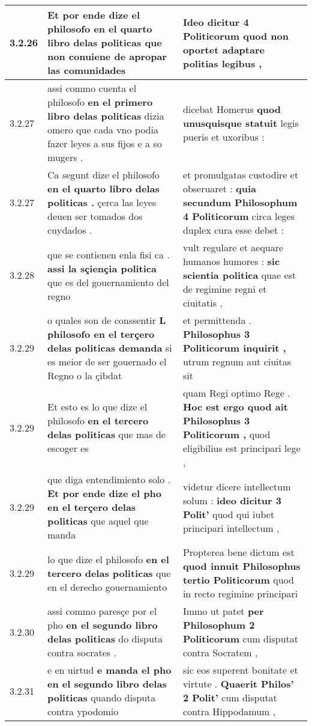 \begin{tabular}{|p{1cm}|p{6.5cm}|p{6.5cm}|}
3.2.26 & Et por ende dize el philosofo \textbf{ en el quarto libro delas politicas } que non conuiene de apropar las comunidades & Ideo dicitur 4 Politicorum \textbf{ quod non oportet } adaptare politias legibus , \\\hline
3.2.27 & assi commo cuenta el philosofo \textbf{ en el primero libro delas politicas } dizia omero que cada vno podia fazer leyes a sus fijos e a so mugers . & dicebat Homerus \textbf{ quod unusquisque statuit } legis pueris et uxoribus : \\\hline
3.2.27 & Ca segunt dize el philosofo \textbf{ en el quarto libro delas politicas . } çerca las leyes deuen ser tomados dos cuydados . & et promulgatas custodire et obseruaret : \textbf{ quia secundum Philosophum 4 Politicorum } circa leges duplex cura esse debet : \\\hline
3.2.28 & que se contienen enla fisi ca . \textbf{ assi la sçiençia politica } que es del gouernamiento del regno & vult regulare et aequare humanos humores : \textbf{ sic scientia politica } quae est de regimine regni et ciuitatis , \\\hline
3.2.29 & o quales son de conssentir \textbf{ L philosofo en el terçero delas politicas demanda } si es meior de ser gouernado el Regno o la çibdat & et permittenda . \textbf{ Philosophus 3 Politicorum inquirit , } utrum regnum aut ciuitas sit \\\hline
3.2.29 & Et esto es lo que dize el philosofo \textbf{ en el tercero delas politicas } que mas de escoger es & quam Regi optimo Rege . \textbf{ Hoc est ergo quod ait Philosophus 3 Politicorum , } quod eligibilius est principari lege , \\\hline
3.2.29 & que diga entendimiento solo . \textbf{ Et por ende dize el pho en el terçero delas politicas } que aquel que manda & videtur dicere intellectum solum : \textbf{ ideo dicitur 3 Polit’ } quod qui iubet principari intellectum , \\\hline
3.2.29 & lo que dize el philosofo \textbf{ en el tercero delas politicas } que en el derecho gouernamiento & Propterea bene dictum est \textbf{ quod innuit Philosophus tertio Politicorum } quod in recto regimine principari \\\hline
3.2.30 & assi commo paresçe por el pho \textbf{ en el segundo libro delas politicas } do disputa contra socrates . & Immo ut patet \textbf{ per Philosophum 2 Politicorum } cum disputat contra Socratem , \\\hline
3.2.31 & e en uirtud \textbf{ e manda el pho en el segundo libro delas politicas } quando disputa contra ypodomio & sic eos superent bonitate et virtute . \textbf{ Quaerit Philos’ 2 Polit’ } cum disputat contra Hippodamum , \\\hline

\end{tabular}
